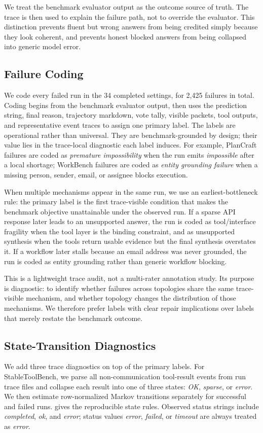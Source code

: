 \documentclass{article}
\theoremstyle{plain}
\theoremstyle{definition}
\theoremstyle{remark}
\begin{document}
We treat the benchmark evaluator output as the outcome source of truth. The trace is then used to explain the failure path, not to override the evaluator. This distinction prevents fluent but wrong answers from being credited simply because they look coherent, and prevents honest blocked answers from being collapsed into generic model error.

\subsection{Failure Coding}
We code every failed run in the 34 completed settings, for 2,425 failures in total. Coding begins from the benchmark evaluator output, then uses the prediction string, final reason, trajectory markdown, vote tally, visible packets, tool outputs, and representative event traces to assign one primary label. The labels are operational rather than universal. They are benchmark-grounded by design; their value lies in the trace-local diagnostic each label induces. For example, PlanCraft failures are coded as \emph{premature impossibility} when the run emits \emph{impossible} after a local shortage; WorkBench failures are coded as \emph{entity grounding failure} when a missing person, sender, email, or assignee blocks execution.

When multiple mechanisms appear in the same run, we use an earliest-bottleneck rule: the primary label is the first trace-visible condition that makes the benchmark objective unattainable under the observed run. If a sparse API response later leads to an unsupported answer, the run is coded as tool/interface fragility when the tool layer is the binding constraint, and as unsupported synthesis when the tools return usable evidence but the final synthesis overstates it. If a workflow later stalls because an email address was never grounded, the run is coded as entity grounding rather than generic workflow blocking.

This is a lightweight trace audit, not a multi-rater annotation study. Its purpose is diagnostic: to identify whether failures across topologies share the same trace-visible mechanism, and whether topology changes the distribution of those mechanisms. We therefore prefer labels with clear repair implications over labels that merely restate the benchmark outcome.

\subsection{State-Transition Diagnostics}
We add three trace diagnostics on top of the primary labels. For StableToolBench, we parse all non-communication tool-result events from run trace files and collapse each result into one of three states: \emph{OK}, \emph{sparse}, or \emph{error}. We then estimate row-normalized Markov transitions separately for successful and failed runs.  gives the reproducible state rules. Observed status strings include \emph{completed}, \emph{ok}, and \emph{error}; status values \emph{error}, \emph{failed}, or \emph{timeout} are always treated as \emph{error}.
\end{document}
